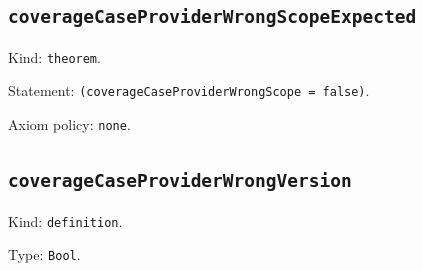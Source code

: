\documentclass[11pt]{article}
\begin{document}
\subsection*{\texttt{coverageCaseProviderWrongScopeExpected}}
\noindent Kind: \texttt{theorem}.\par
\noindent Statement: \texttt{(coverageCaseProviderWrongScope = false)}.\par
\noindent Axiom policy: \texttt{none}.\par
\subsection*{\texttt{coverageCaseProviderWrongVersion}}
\noindent Kind: \texttt{definition}.\par
\noindent Type: \texttt{Bool}.\par
\end{document}
